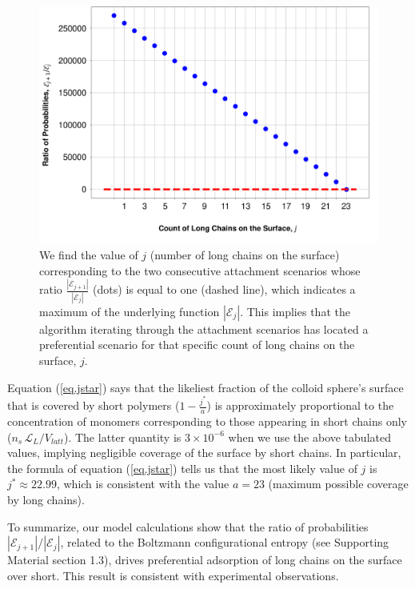 \documentclass[twoside,twocolumn,9pt]{article}
\newcommand{\leng}{\mathcal{L}}
\begin{document}
\begin{figure}[h]
\centering
\includegraphics[scale=0.22]{Figure8.pdf}
\caption{We find the value of $j$ (number of long chains on the surface) corresponding to the two consecutive attachment scenarios whose ratio $\frac{|\mathcal{E}_{j+1}|}{|\mathcal{E}_j|}$ (dots) is equal to one (dashed line), which indicates a maximum of the underlying function $|\mathcal{E}_j|$. This implies that the algorithm iterating through the attachment scenarios has located a preferential scenario for that specific count of long chains on the surface, $j$.}
\label{figure 11}
\end{figure}

Equation (\ref{eq.jstar}) says that the likeliest fraction of the colloid sphere's surface that is covered by short polymers ($1-\frac{j^*}{a}$) is approximately proportional to the concentration of monomers corresponding to those appearing in short chains only
($n_s\,\leng_L/V_{latt}$).  The latter quantity is $3\times 10^{-6}$ when we use the above tabulated values, implying negligible coverage of the surface by short chains.  In particular, the formula of equation (\ref{eq.jstar}) tells us that the most likely value of $j$ is $j^*\approx 22.99$, which is consistent with the value $a=23$ (maximum possible coverage by long chains).

To summarize, our model calculations show that the ratio of probabilities $|\mathcal{E}_{j+1}|/|\mathcal{E}_j|$, related to the Boltzmann configurational entropy (see Supporting Material section 1.3), drives preferential adsorption of long chains on the surface over short. This result is consistent with experimental observations.
\end{document}
